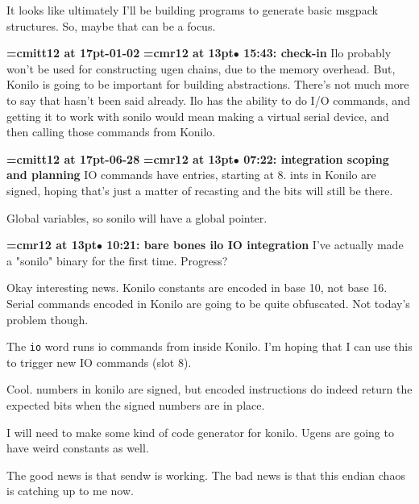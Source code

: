 It looks like ultimately I'll be building programs to generate basic msgpack structures. So, maybe that can be a focus.
\par

{\medskip\noindent\bf\font\titlefont=cmitt12 at 17pt-01-02}\medskip
{\smallskip\noindent\bf\font\titlefont=cmr12 at 13pt\titlefont $\bullet$ 15:43: check-in}\smallskip
Ilo probably won't be used for constructing ugen chains, due to the memory overhead. But, Konilo is going to be important for building abstractions. There's not much more to say that hasn't been said already. Ilo has the ability to do I/O commands, and getting it to work with sonilo would mean making a virtual serial device, and then calling those commands from Konilo.
\par

{\medskip\noindent\bf\font\titlefont=cmitt12 at 17pt-06-28}\medskip
{\smallskip\noindent\bf\font\titlefont=cmr12 at 13pt\titlefont $\bullet$ 07:22: integration scoping and planning}\smallskip
IO commands have entries, starting at 8. ints in Konilo are signed, hoping that's just a matter of recasting and the bits will still be there.
\par

Global variables, so sonilo will have a global pointer.
\par

{\smallskip\noindent\bf\font\titlefont=cmr12 at 13pt\titlefont $\bullet$ 10:21: bare bones ilo IO integration}\smallskip
I've actually made a "sonilo" binary for the first time. Progress?
\par

Okay interesting news. Konilo constants are encoded in base 10, not base 16. Serial commands encoded in Konilo are going to be quite obfuscated. Not today's problem though.
\par

The {\tt io} word runs io commands from inside Konilo. I'm hoping that I can use this to trigger new IO commands (slot 8).
\par

Cool. numbers in konilo are signed, but encoded instructions do indeed return the expected bits when the signed numbers are in place.
\par

I will need to make some kind of code generator for konilo. Ugens are going to have weird constants as well.
\par

The good news is that sendw is working. The bad news is that this endian chaos is catching up to me now.
\par

